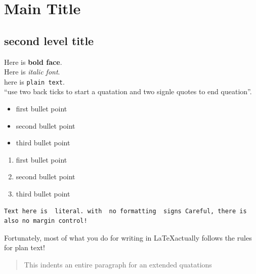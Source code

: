 \documentclass{article}\usepackage[]{graphicx}\usepackage[]{color}
\begin{document}

\section{Main Title}

\subsection{second level title}
Here is \textbf{bold face}.\\
Here is \textit{italic font}.\\
here is \texttt{plain text}.\\

``use two back ticks to start a quatation and two signle quotes to end queation''.

\begin{itemize}
 \item first bullet point
 \item second bullet point
 \item third bullet point
\end {itemize}

\begin{enumerate}
 \item first bullet point
 \item second bullet point
 \item third bullet point
\end {enumerate}

\begin{verbatim}
Text here is  literal. with  no formatting  signs Careful, there is also no margin control!
\end{verbatim}

Fortunately, most of what you do for writing in \LaTeX actually follows the rules for plan text!

\begin{quote}
This  indents an entire paragraph for an extended quatations
\end {quote}
\end{document}
